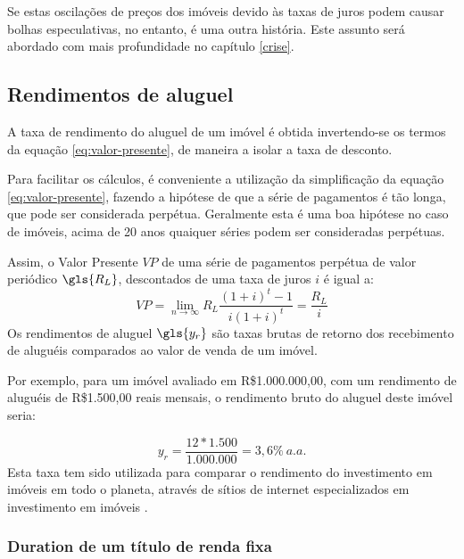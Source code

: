 \documentclass[
	12pt,				%
	oneside,			%
	a4paper,			%
	chapter=TITLE,		%
	section=TITLE,		%
	english,			%
	brazil				%
	]{abntex2}
\begin{document}
Se estas oscilações de preços dos imóveis devido às taxas de juros podem causar
bolhas especulativas, no entanto, é uma outra história. Este assunto será abordado com mais profundidade no capítulo \ref{crise}.

\hypertarget{rendimentos-de-aluguel}{%
\subsection{Rendimentos de aluguel}\label{rendimentos-de-aluguel}}

A taxa de rendimento do aluguel de um imóvel é obtida invertendo-se os termos
da equação \eqref{eq:valor-presente}, de maneira a isolar a taxa de desconto.

Para facilitar os cálculos, é conveniente a utilização da simplificação da
equação \eqref{eq:valor-presente}, fazendo a hipótese de que a série de
pagamentos é tão longa, que pode ser considerada perpétua. Geralmente esta é
uma boa hipótese no caso de imóveis, acima de 20 anos quaiquer séries podem ser
consideradas perpétuas.

Assim, o Valor Presente \(VP\) de uma série de pagamentos perpétua de valor
periódico \(\gls{R_L}\), descontados de uma taxa de juros \(i\) é igual a:
\begin{equation}
VP = \lim_{n \to \infty} R_L \frac{(1+i)^t-1}{i(1+i)^t}= \frac{R_L}{i}
\label{eq:perpetua}
\end{equation}
Os rendimentos de aluguel \(\gls{y_r}\) são taxas brutas de retorno dos
recebimento de aluguéis comparados ao valor de venda de um imóvel.

Por exemplo, para um imóvel avaliado em R\$1.000.000,00, com um rendimento de
aluguéis de R\$1.500,00 reais mensais, o rendimento bruto do aluguel
deste imóvel seria:

\[y_r = \frac{12*1.500}{1.000.000} = 3,6\% \ a.a.\]
Esta taxa tem sido utilizada para comparar o rendimento do investimento em
imóveis em todo o planeta, através de sítios de internet especializados em
investimento em imóveis \autocite{gpg}.

\hypertarget{duration-de-um-tuxedtulo-de-renda-fixa}{%
\subsubsection{Duration de um título de renda fixa}\label{duration-de-um-tuxedtulo-de-renda-fixa}}
\end{document}
